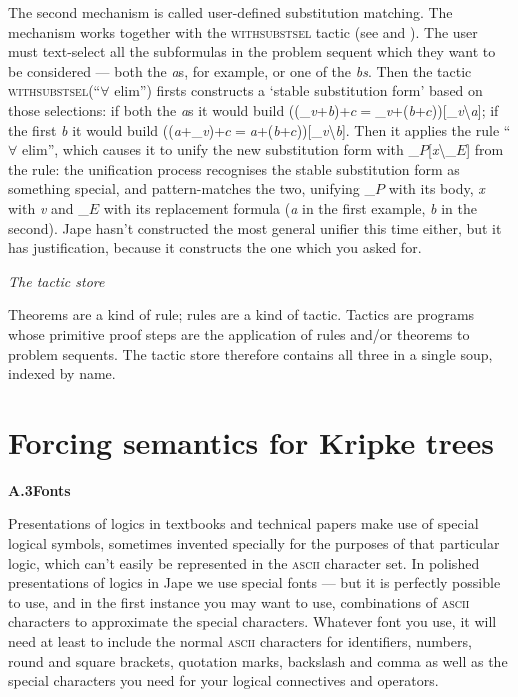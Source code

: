 The second mechanism is called user-defined substitution matching. The mechanism works together with the \textsc{withsubstsel} tactic (see  and ). The user must text-select all the subformulas in the problem sequent which they want to be considered --- both the \textit{a}s, for example, or one of the \textit{bs}. Then the tactic \textsc{withsubstsel}(``\ensuremath{\forall} elim'') firsts constructs a `stable substitution form' based on those selections: if both the \textit{a}s it would build ((\_\textit{v}+\textit{b})+$c$\ensuremath{=}\_\textit{v}+(\textit{b}+$c$))[\_\textit{v}{\textbackslash}\textit{a}]; if the first \textit{b} it would build ((\textit{a}+\_\textit{v})+$c$\ensuremath{=}\textit{a}+(\textit{b}+$c$))[\_\textit{v}{\textbackslash}\textit{b}]. Then it applies the rule ``\ensuremath{\forall} elim'', which causes it to unify the new substitution form with \_$P$[\textit{x}{\textbackslash}\_$E$] from the rule: the unification process recognises the stable substitution form as something special, and pattern-matches the two, unifying \_$P$ with its body, \textit{x} with \textit{v} and \_$E$ with its replacement formula (\textit{a} in the first example, \textit{b} in the second). Jape hasn't constructed the most general unifier this time either, but it has justification, because it constructs the one which you asked for.


\textit{The tactic store}


Theorems are a kind of rule; rules are a kind of tactic. Tactics are programs whose primitive proof steps are the application of rules and/or theorems to problem sequents. The tactic store therefore contains all three in a single soup, indexed by name.

\section{Forcing semantics for Kripke trees}
\textbf{{\large A.3\tab Fonts}}


Presentations of logics in textbooks and technical papers make use of special logical symbols, sometimes invented specially for the purposes of that particular logic, which can't easily be represented in the \textsc{ascii} character set. In polished presentations of logics in Jape we use special fonts --- but it is perfectly possible to use, and in the first instance you may want to use, combinations of \textsc{ascii} characters to approximate the special characters. Whatever font you use, it will need at least to include the normal \textsc{ascii} characters for identifiers, numbers, round and square brackets, quotation marks, backslash and comma as well as the special characters you need for your logical connectives and operators.


